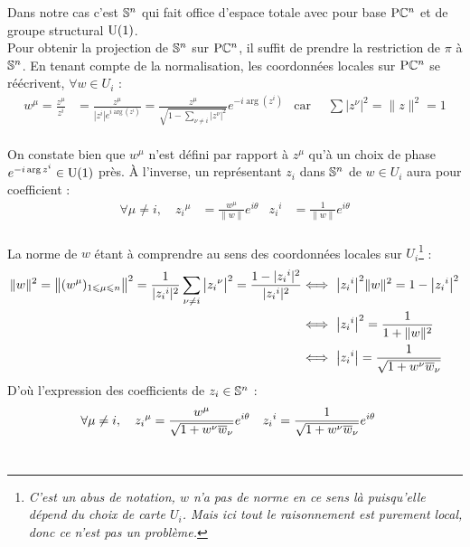 Dans notre cas c'est $\S{n}$ qui fait office d'espace totale avec pour base $\PC{n}$ et de groupe structural $\U{1}$.
\\
Pour obtenir la projection de $\S{n}$ sur $\PC{n}$, il suffit de prendre la restriction de $\pi$ à $\S{n}$. En tenant compte de la normalisation, les coordonnées locales sur $\PC{n}$ se réécrivent, $\forall w\in U_i$ :
\begin{align*}
	w^\mu = \frac{z^\mu}{z^i} &= \frac{z^\mu}{|z^i|e^{i\arg (z^i)}} = \frac{z^{\mu}}{\sqrt{1 - \sum_{\nu \neq i} |z^\nu|^2}} e^{-i\arg(z^i)}  &  \text{car }\quad \sum \big|z^\nu\big|^2 = \|z\|^2 = 1
\end{align*}
\\
On constate bien que $w^\mu$ n'est défini par rapport à $z^\mu$ qu'à un choix de phase $e^{-i\arg z^i}\in \U{1}$ près. À l'inverse, un représentant $z_i$ dans $\S{n}$ de $w\in U_i$ aura pour coefficient :
\begin{align*}
	\forall \mu\neq i,\quad {z_i}^\mu &= \frac{w^\mu}{\|w\|}e^{i\theta}  &  {z_i}^i &= \frac{1}{\|w\|}e^{i\theta} 
\end{align*}
\\
La norme de $w$ étant à comprendre au sens des coordonnées locales sur $U_i$\footnote{\itshape
	C'est un abus de notation, $w$ n'a pas de norme en ce sens là puisqu'elle dépend du choix de carte $U_i$. Mais ici tout le raisonnement est purement local, donc ce n'est pas un problème.
} :
\begin{align*}
	\|w\|^2 = \big\|(w^\mu)_{1\leq \mu\leq n}\big\|^2 = \frac{1}{|{z_i}^i|^2}\sum_{\nu \neq i} \big|{z_i}^\nu\big|^2 = \frac{1 - |{z_i}^i|^2}{|{z_i}^i|^2} &\Llr\ \big| {z_i}^i \big|^2 \|w\|^2 = 1 - \big|{z_i}^i\big|^2 \\
	&\Llr\ \big|{z_i}^i\big|^2 = \frac{1}{1 + \|w\|^2} \\
	&\Llr\ \big|{z_i}^i\big| = \frac{1}{\sqrt{1 + w^\nu \congu{w}_\nu}}
\end{align*}
D'où l'expression des coefficients de $z_i\in\S{n}$ :
\begin{align*}
	 \forall \mu\neq i,\quad {z_i}^\mu &= \frac{w^\mu}{\sqrt{1 + w^\nu \congu{w}_\nu}}e^{i\theta}  &  {z_i}^i &= \frac{1}{\sqrt{1 + w^\nu \congu{w}_\nu}}e^{i\theta} 
\end{align*}
\\

